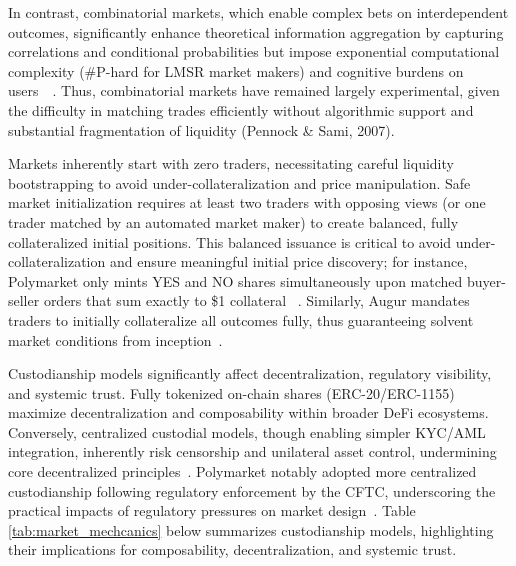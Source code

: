 {In contrast, combinatorial markets, which enable complex bets on interdependent outcomes, significantly enhance theoretical information aggregation by capturing correlations and conditional probabilities but impose exponential computational complexity (\#P-hard for LMSR market makers) and cognitive burdens on users~\cite{CFLPW08}~\cite{CP10}. Thus, combinatorial markets have remained largely experimental, given the difficulty in matching trades efficiently without algorithmic support and substantial fragmentation of liquidity (Pennock \& Sami, 2007).

Markets inherently start with zero traders, necessitating careful liquidity bootstrapping to avoid under-collateralization and price manipulation. Safe market initialization requires at least two traders with opposing views (or one trader matched by an automated market maker) to create balanced, fully collateralized initial positions. This balanced issuance is critical to avoid under-collateralization and ensure meaningful initial price discovery; for instance, Polymarket only mints YES and NO shares simultaneously upon matched buyer-seller orders that sum exactly to \$1 collateral ~\cite{BCFKMN14}. Similarly, Augur mandates traders to initially collateralize all outcomes fully, thus guaranteeing solvent market conditions from inception~\cite{AKPWZ19}.

Custodianship models significantly affect decentralization, regulatory visibility, and systemic trust. Fully tokenized on-chain shares (ERC-20/ERC-1155) maximize decentralization and composability within broader DeFi ecosystems. Conversely, centralized custodial models, though enabling simpler KYC/AML integration, inherently risk censorship and unilateral asset control, undermining core decentralized principles~\cite{Du19}. Polymarket notably adopted more centralized custodianship following regulatory enforcement by the CFTC, underscoring the practical impacts of regulatory pressures on market design~\cite{Ma24}.
Table \ref{tab:market_mechcanics} below summarizes custodianship models, highlighting their implications for composability, decentralization, and systemic trust.

}
